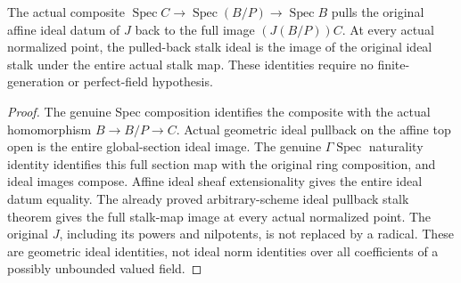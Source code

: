 \begin{theorem}
\label{scheme:normalized-component-original-ideals}
\leanok
{}
The actual composite $\operatorname{Spec}C\to\operatorname{Spec}(B/P)
\to\operatorname{Spec}B$ pulls the original affine ideal datum of $J$
back to the full image $(J(B/P))C$. At every actual normalized point,
the pulled-back stalk ideal is the image of the original ideal stalk
under the entire actual stalk map. These identities require no
finite-generation or perfect-field hypothesis.
\end{theorem}
\begin{proof}
The genuine Spec composition identifies the composite with the actual
homomorphism $B\to B/P\to C$. Actual geometric ideal pullback on the
affine top open is the entire global-section ideal image. The genuine
$\Gamma\operatorname{Spec}$ naturality identity identifies this full
section map with the original ring composition, and ideal images compose.
Affine ideal sheaf extensionality gives the entire ideal datum equality.
The already proved arbitrary-scheme ideal pullback stalk theorem gives
the full stalk-map image at every actual normalized point. The original
$J$, including its powers and nilpotents, is not replaced by a radical.
These are geometric ideal identities, not ideal norm identities over
all coefficients of a possibly unbounded valued field.
\end{proof}

